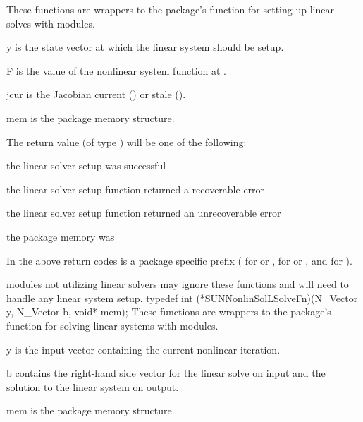 {
  These functions are wrappers to the {\sundials} package's function
  for setting up linear solves with {\sunlinsol} modules.
}
{
  \begin{args}[mem]
  \item[y]
    is the state vector at which the linear system should be setup.
  \item[F]
    is the value of the nonlinear system function at .
  \item[jcur]
    is the Jacobian current () or stale ().
  \item[mem]
    is the {\sundials} package memory structure.
  \end{args}
}
{
  The return value  (of type ) will be one of the
  following:
  \begin{args}
  \item[\id{*\_SUCCESS}]
    the linear solver setup was successful
  \item[\id{*\_LSETUP\_RECVR}]
    the linear solver setup function returned a recoverable error
  \item[\id{*\_LSETUP\_FAIL}]
    the linear solver setup function returned an unrecoverable error
  \item[\id{*\_MEM\_NULL}]
    the {\sundials} package memory was 
  \end{args}
  In the above return codes \id{*} is a {\sundials} package specific
  prefix ( for {\cvode} or {\cvodes},  for {\ida} or
  {\idas}, and  for {\arkode}).
}
{
  {\sunnonlinsol} modules not utilizing {\sunlinsol} linear solvers
  may ignore these functions and will need to handle any linear system
  setup.
}
{
  typedef int (*SUNNonlinSolLSolveFn)(N\_Vector y, N\_Vector b, void* mem);
}
{
  These functions are wrappers to the {\sundials} package's function
  for solving linear systems with {\sunlinsol} modules.
}
{
  \begin{args}[mem]
  \item[y]
    is the input vector containing the current nonlinear iteration.
  \item[b]
    contains the right-hand side vector for the linear solve on input
    and the solution to the linear system on output.
  \item[mem]
    is the {\sundials} package memory structure.
  \end{args}
}
